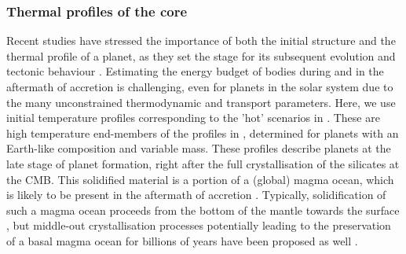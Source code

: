 \documentclass[draft]{agujournal2019} %
\begin{document}
\subsubsection{Thermal profiles of the core}\label{sec:profiles}

Recent studies have stressed the importance of both the initial structure and the thermal profile of a planet, as they set the stage for its subsequent evolution and tectonic behaviour \cite{stein2004effect,breuer_thermal_2010,stamenkovic2012influence,stamenkovic2014tectonic,ONEILL201680,dorn_outgassing_2018}. Estimating the energy budget of bodies during and in the aftermath of accretion is challenging, even for planets in the solar system due to the many unconstrained thermodynamic and transport parameters. Here, we use initial temperature profiles corresponding to the 'hot' scenarios in . These are high temperature end-members of the profiles in , determined for planets with an Earth-like composition and variable mass. These profiles describe planets at the late stage of planet formation, right after the full crystallisation of the silicates at the CMB. This solidified material is a portion of a (global) magma ocean, which is likely to be present in the aftermath of accretion \cite{abe1997thermal,canup2004dynamics,nakajima2015melting}. Typically, solidification of such a magma ocean proceeds from the bottom of the mantle towards the surface \cite{andrault2011solidus,monteux2016cooling}, but middle-out crystallisation processes potentially leading to the preservation of a basal magma ocean for billions of years have been proposed as well \cite{labrosse2007crystallizing,stixrude2009thermodynamics,nomura2011spin}.
\end{document}
